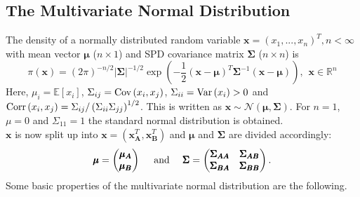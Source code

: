 \subsection{The Multivariate Normal Distribution}
The density of a normally distributed random variable $\pmb{x}=\left(x_1,...,x_n\right)^T, n<\infty$ with mean vector $\pmb{\mu}$ ($n\times1$) and SPD covariance matrix $\pmb{\Sigma}$ ($n\times n$) is
\begin{equation}
    \pi\left(\pmb{x}\right)=\left(2\pi\right)^{-n/2}|\pmb{\Sigma}|^{-1/2}\exp\left(-\frac{1}{2}\left(\pmb{x}-\pmb{\mu}\right)^T\pmb{\Sigma}^{-1}\left(\pmb{x}-\pmb{\mu}\right)\right),\hspace{5pt}\pmb{x}\in\mathbb{R}^n
\end{equation}
Here, $\mu_i=\mathbb{E}\left[x_i\right]$, $ \Sigma_{ij}=\hbox{Cov}\left(x_i,x_j\right)$, $ \Sigma_{ii}=\hbox{Var}\left(x_i\right) > 0$ and $\hbox{Corr}\left(x_i,x_j\right)=\Sigma_{ij}/\left(\Sigma_{ii}\Sigma_{jj}\right)^{1/2}$. This is written as $\pmb{x}\sim\mathcal{N}\left(\pmb{\mu},\pmb{\Sigma}\right)$. For $n=1$, $\mu=0$ and $\Sigma_{11}=1$ the standard normal distribution is obtained. \\
$\pmb{x}$ is now split up into $\pmb{x}=\left(\pmb{x}_{\pmb{A}}^T,\pmb{x}_{\pmb{B}}^T\right)$ and $\pmb{\mu}$ and $\pmb{\Sigma}$ are divided accordingly:
\begin{equation*}
    \pmb{\mu} = \begin{pmatrix}\pmb{\mu}_{\pmb{A}} \\ \pmb{\mu}_{\pmb{B}}\end{pmatrix} \hspace{10pt}\hbox{ and }\hspace{10pt} \pmb{\Sigma}=\begin{pmatrix}\pmb{\Sigma}_{\pmb{AA}} & \pmb{\Sigma}_{\pmb{AB}}\\\pmb{\Sigma}_{\pmb{BA}} & \pmb{\Sigma}_{\pmb{BB}}\end{pmatrix}.
\end{equation*}
Some basic properties of the multivariate normal distribution are the following.
